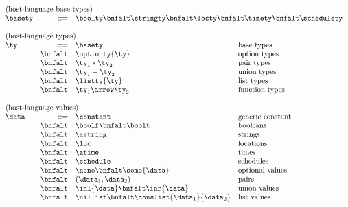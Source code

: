 \begin{figure}[t]
\[
\begin{array}{lrll}
\multicolumn{4}{l}{\mbox{(host-language base types)}}\\ 
\basety & ::= & \multicolumn{2}{l}{\boolty \bnfalt \stringty \bnfalt \locty \bnfalt \timety \bnfalt \schedulety} \\
\\
\multicolumn{4}{l}{\mbox{(host-language types)}}\\ 
\ty & ::= & \basety & \mbox{base types} \\
 & \bnfalt & \optionty{\ty} & \mbox{option types}\\
 & \bnfalt & \ty_1 * \ty_2 & \mbox{pair types} \\
 & \bnfalt & \ty_1 + \ty_2 & \mbox{union types} \\
 & \bnfalt & \listty{\ty} & \mbox{list types}\\
 & \bnfalt & \ty_1 \arrow \ty_2 & \mbox{function types} \\
\\
\multicolumn{4}{l}{\mbox{(host-language values)}}\\ 
\data & ::=     & \constant & \mbox{generic constant} \\
 & \bnfalt & \boolf \bnfalt \boolt & \mbox{booleans} \\
 & \bnfalt & \astring & \mbox{strings} \\
 & \bnfalt & \loc & \mbox{locations} \\
 & \bnfalt & \atime & \mbox{times} \\
 & \bnfalt & \schedule & \mbox{schedules} \\
 & \bnfalt & \none \bnfalt 
                           \some{\data} & \mbox{optional values}\\
 & \bnfalt & (\data_1,\data_2) & \mbox{pairs} \\
 & \bnfalt & \inl{\data} \bnfalt 
                           \inr{\data} & \mbox{union values} \\
 & \bnfalt & \nillist \bnfalt 
                           \conslist{\data_1}{\data_2} & \mbox{list values} \\


\end{array}\]
\end{figure}

